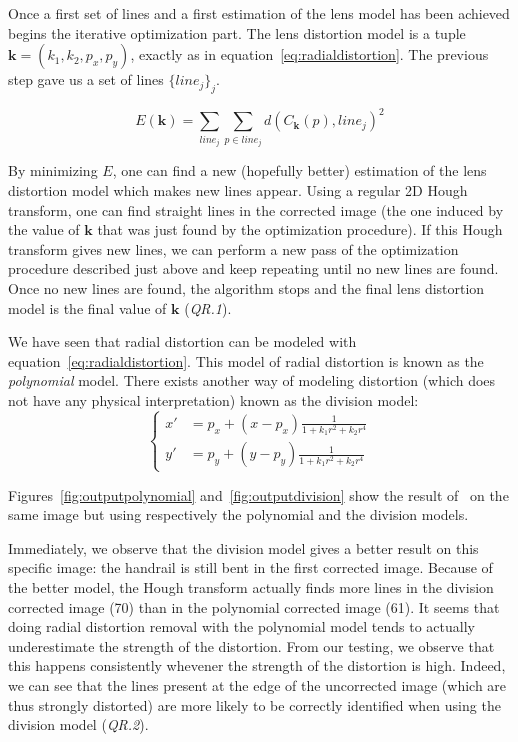 Once a first set of lines and a first estimation of the lens model has been achieved begins the iterative optimization
part.
The lens distortion model is a tuple $\mathbf{k}=(k_1,k_2,p_x,p_y)$, exactly as in equation~\eqref{eq:radialdistortion}.
The previous step gave us a set of lines $\{line_j\}_j$.

\begin{equation}\label{eq:energydistortion}
    E(\mathbf{k})=\sum_{line_j}\sum_{p\in line_j}d(C_{\mathbf{k}}(p), line_j)^2
\end{equation}

By minimizing $E$, one can find a new (hopefully better) estimation of the lens distortion model which makes new lines
appear.
Using a regular 2D Hough transform, one can find straight lines in the corrected image (the one induced by the
value of $\mathbf{k}$ that was just found by the optimization procedure).
If this Hough transform gives new lines, we can perform a new pass of the optimization procedure described just above
and keep repeating until no new lines are found.
Once no new lines are found, the algorithm stops and the final lens distortion model is the final value of
$\mathbf{k}$ (\textit{QR.1}).

We have seen that radial distortion can be modeled with equation~\eqref{eq:radialdistortion}.
This model of radial distortion is known as the \textit{polynomial} model.
There exists another way of modeling distortion (which does not have any physical interpretation) known as the
division model:
\begin{equation}\label{eq:radialdistortiondivision}
    \begin{cases}
    x'&=p_x+(x-p_x)\frac{1}{1+k_1 r^2+k_2 r^4}\\
    y'&=p_y+(y-p_y)\frac{1}{1+k_1 r^2+k_2 r^4}
\end{cases}
\end{equation}

Figures~\ref{fig:outputpolynomial} and~\ref{fig:outputdivision} show the result of~\citep{lensdistortioncorrection} on
the same image but using respectively the polynomial and the division models.

Immediately, we observe that the division model gives a better result on this specific image: the handrail is still
bent in the first corrected image.
Because of the better model, the Hough transform actually finds more lines in the division corrected image (70) than in
the polynomial corrected image (61).
It seems that doing radial distortion removal with the polynomial model tends to actually underestimate the strength
of the distortion.
From our testing, we observe that this happens consistently whevener the strength of the distortion is high.
Indeed, we can see that the lines present at the edge of the uncorrected image (which are thus strongly distorted) are
more likely to be correctly identified when using the division model (\textit{QR.2}).

